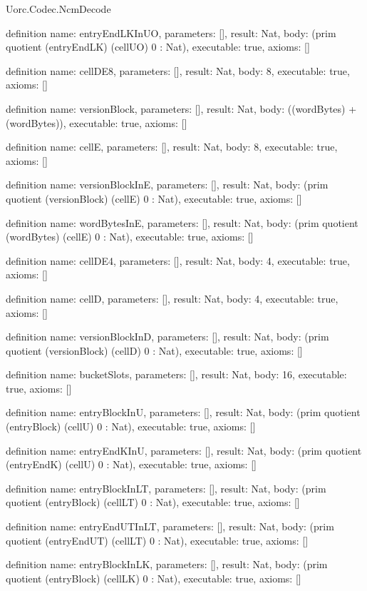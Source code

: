 \begin{lexlean}{Uorc.Codec.NcmDecode}
\begin{semanticmodule}
definition{
  name: entryEndLKInUO,
  parameters: [],
  result: Nat,
  body: (prim quotient (entryEndLK) (cellUO) 0 : Nat),
  executable: true,
  axioms: []
}

definition{
  name: cellDE8,
  parameters: [],
  result: Nat,
  body: 8,
  executable: true,
  axioms: []
}

definition{
  name: versionBlock,
  parameters: [],
  result: Nat,
  body: ((wordBytes) + (wordBytes)),
  executable: true,
  axioms: []
}

definition{
  name: cellE,
  parameters: [],
  result: Nat,
  body: 8,
  executable: true,
  axioms: []
}

definition{
  name: versionBlockInE,
  parameters: [],
  result: Nat,
  body: (prim quotient (versionBlock) (cellE) 0 : Nat),
  executable: true,
  axioms: []
}

definition{
  name: wordBytesInE,
  parameters: [],
  result: Nat,
  body: (prim quotient (wordBytes) (cellE) 0 : Nat),
  executable: true,
  axioms: []
}

definition{
  name: cellDE4,
  parameters: [],
  result: Nat,
  body: 4,
  executable: true,
  axioms: []
}

definition{
  name: cellD,
  parameters: [],
  result: Nat,
  body: 4,
  executable: true,
  axioms: []
}

definition{
  name: versionBlockInD,
  parameters: [],
  result: Nat,
  body: (prim quotient (versionBlock) (cellD) 0 : Nat),
  executable: true,
  axioms: []
}

definition{
  name: bucketSlots,
  parameters: [],
  result: Nat,
  body: 16,
  executable: true,
  axioms: []
}

definition{
  name: entryBlockInU,
  parameters: [],
  result: Nat,
  body: (prim quotient (entryBlock) (cellU) 0 : Nat),
  executable: true,
  axioms: []
}

definition{
  name: entryEndKInU,
  parameters: [],
  result: Nat,
  body: (prim quotient (entryEndK) (cellU) 0 : Nat),
  executable: true,
  axioms: []
}

definition{
  name: entryBlockInLT,
  parameters: [],
  result: Nat,
  body: (prim quotient (entryBlock) (cellLT) 0 : Nat),
  executable: true,
  axioms: []
}

definition{
  name: entryEndUTInLT,
  parameters: [],
  result: Nat,
  body: (prim quotient (entryEndUT) (cellLT) 0 : Nat),
  executable: true,
  axioms: []
}

definition{
  name: entryBlockInLK,
  parameters: [],
  result: Nat,
  body: (prim quotient (entryBlock) (cellLK) 0 : Nat),
  executable: true,
  axioms: []
}


\end{semanticmodule}
\end{lexlean}
